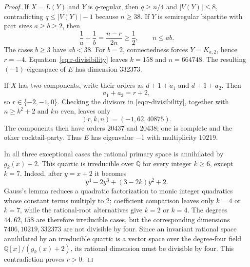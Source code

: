 \documentclass[a4paper,10pt,reqno]{amsart}
\theoremstyle{plain}
\theoremstyle{definition}
\theoremstyle{remark}
\begin{document}
\begin{proof}
If \(X=L(Y)\) and \(Y\) is \(q\)-regular, then \(q\ge n/4\) and
\(|V(Y)|\le8\), contradicting \(q\le |V(Y)|-1\) because \(n\ge38\).
If \(Y\) is semiregular bipartite with part sizes \(a\ge b\ge2\), then
\[
 \frac1a+\frac1b=\frac{n-r}{2n}\ge\frac12,\qquad n\le ab.
\]
The cases \(b\ge3\) have \(ab<38\).  For \(b=2\), connectedness forces
\(Y=K_{a,2}\), hence \(r=-4\).  Equation~\eqref{eq:r-divisibility} leaves
\(k=158\) and \(n=664748\).  The resulting \((-1)\)-eigenspace of \(E\)
 has dimension \(332373\).

If \(X\) has two components, write their orders as
\(d+1+a_1\) and \(d+1+a_2\).  Then
\[
 a_1+a_2=r+2,
\]
so \(r\in\{-2,-1,0\}\).  Checking the divisors in
\eqref{eq:r-divisibility}, together with \(n\ge k^2+2\) and \(kn\) even,
leaves only
\[
 (r,k,n)=(-1,62,40875).
\]
The components then have orders \(20437\) and \(20438\); one is complete
and the other cocktail-party.  Thus \(E\) has eigenvalue \(-1\) with
 multiplicity \(10219\).

 In all three exceptional cases the rational primary space is annihilated by
 \(g_k(x)+2\).  This quartic is irreducible over \(\mathbb Q\) for every
 integer \(k\ge6\), except \(k=7\).  Indeed, after \(y=x+2\) it becomes
 \[
  y^4-2y^3+(3-2k)y^2+2.
 \]
 Gauss's lemma reduces a quadratic factorization to monic integer quadratics
 whose constant terms multiply to \(2\); coefficient comparison leaves only
 \(k=4\) or \(k=7\), while the rational-root alternatives give \(k=2\) or
 \(k=4\).  The degrees \(44,62,158\) are therefore irreducible cases, but the
 corresponding dimensions \(7406,10219,332373\) are not divisible by four.
 Since an invariant rational space annihilated by an irreducible quartic is a
 vector space over the degree-four field \(\mathbb Q[x]/(g_k(x)+2)\), its
 rational dimension must be divisible by four.
 This contradiction proves \(r>0\).


\end{proof}
\end{document}
